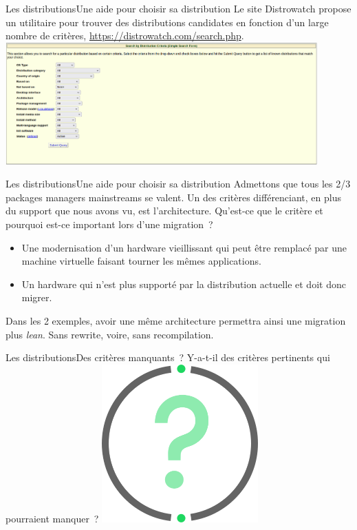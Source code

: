 \documentclass{beamer}
\begin{document}
    \begin{frame}{Les distributions}{Une aide pour choisir sa distribution}
        Le site Distrowatch propose un utilitaire pour trouver des distributions candidates en fonction d'un large nombre de critères, \url{https://distrowatch.com/search.php}.
        \bigbreak
        \centering
        \includegraphics[width=12cm]{image/distrowatch-search}
    \end{frame}

    \begin{frame}{Les distributions}{Une aide pour choisir sa distribution}
        Admettons que tous les 2/3 packages managers mainstreams se valent.
        \bigbreak
        Un des critères différenciant, en plus du support que nous avons vu, est l'architecture.
        \bigbreak
        Qu'est-ce que le critère  et pourquoi est-ce important lors d'une migration~?
        \pause
        \bigbreak
        \begin{itemize}
            \item Une modernisation d'un hardware vieillissant qui peut être remplacé par une machine virtuelle faisant tourner les mêmes applications.
            \item Un hardware qui n'est plus supporté par la distribution actuelle et doit donc migrer.
        \end{itemize}
        Dans les 2 exemples, avoir une même architecture permettra ainsi une migration plus \textit{lean}.
        Sans rewrite, voire, sans recompilation.
    \end{frame}

    \begin{frame}{Les distributions}{Des critères manquants~?}
        Y-a-t-il des critères pertinents qui pourraient manquer~?
        \bigbreak
        \centering
        \includegraphics[width=6cm]{image/question-mark}
    \end{frame}
\end{document}
